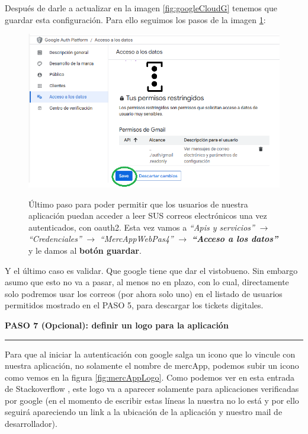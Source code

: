 \documentclass[a4paper,12pt]{report}
\begin{document}
	Después de darle a actualizar en la imagen \ref{fig:googleCloudG} tenemos que guardar esta configuración. Para ello seguimos los pasos de la imagen \ref{fig:googleCloudH}:
	
	
	\FloatBarrier
	\setlength{\belowcaptionskip}{3pt}
	\begin{figure}[H]
		\centering
		\caption{Último paso para poder permitir que los usuarios de nuestra aplicación puedan acceder a leer SUS correos electrónicos una vez autenticados, con oauth2. Esta vez vamos a \textit{``Apis y servicios''} $\rightarrow$ \textit{``Credenciales''} $\rightarrow$ \textit{``MercAppWebPas4''} $\rightarrow$ \textbf{\textit{``Acceso a los datos''}} y le damos al \textbf{botón guardar}. }
		\includegraphics[width=1\linewidth]{img/googleCloudH}
		\label{fig:googleCloudH}
	\end{figure}
	\FloatBarrier
	
	Y el último caso es validar. Que google tiene que dar el vistobueno. Sin embargo asumo que esto no va a pasar, al menos no en plazo, con lo cual, directamente solo podremos usar los correos (por ahora solo uno) en el listado de usuarios permitidos mostrado en el PASO 5, para descargar los tickets digitales.
	
	
	\noindent \textbf{PASO 7 (Opcional): definir un logo para la aplicación}
	\vspace{.1em}
	\hrule
	\vspace{.5em}
	
	Para que al iniciar la autenticación con google salga un icono que lo vincule con nuestra aplicación, no solamente el nombre de mercApp, podemos subir un icono como vemos en la figura \ref{fig:mercAppLogo}. Como podemos ver en esta entrada de Stackoverflow \cite{stackoverflow_oauth_consent_logo}, este logo va a aparecer solamente para aplicaciones verificadas por google (en el momento de escribir estas líneas la nuestra no lo está y por ello seguirá apareciendo un link a la ubicación de la aplicación y nuestro mail de desarrollador).
	
\end{document}
